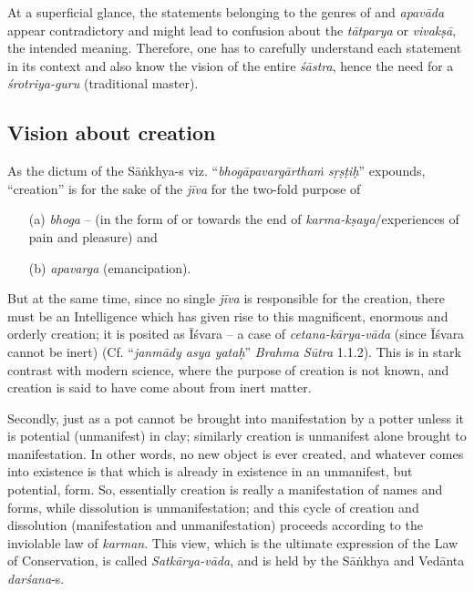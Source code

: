 At a superﬁcial glance, the statements belonging to the genres of and {\sl apavāda} appear contradictory and might lead to confusion about the {\sl tātparya} or {\sl vivakṣā}, the intended meaning. Therefore, one has to carefully understand each statement in its context and also know the vision of the entire {\sl śāstra}, hence the need for a {\sl śrotriya-guru} (traditional master).\\[-20pt]

\subsection{Vision about creation}\label{art12-sec2.3}

As the dictum of the Sāṅkhya-s viz. ``{\sl bhogāpavargārthaṁ sṛṣṭiḥ}'' expounds, ``creation'' is for the sake of the {\sl jīva} for the two-fold purpose of 
\begin{itemize}
\itemsep=0pt
\item[(a)] {\sl bhoga} -- (in the form of or towards the end of {\sl karma-kṣaya}/experiences of pain and pleasure) and 

\item[(b)] {\sl apavarga} (emancipation). 
\end{itemize}
But at the same time, since no single {\sl jīva} is responsible for the creation, there must be an Intelligence which has given rise to this magniﬁcent, enormous and orderly creation; it is posited as Īśvara -- a case of {\sl cetana-kārya-vāda} (since Īśvara cannot be inert) (Cf. ``{\sl janmādy asya yataḥ}'' {\sl Brahma Sūtra} 1.1.2). This is in stark contrast with modern science, where the purpose of creation is not known, and creation is said to have come about from inert matter. 

Secondly, just as a pot cannot be brought into manifestation by a potter unless it is potential (unmanifest) in clay; similarly creation is unmanifest alone brought to manifestation. In other words, no new object is ever created, and whatever comes into existence is that which is already in existence in an unmanifest, but potential, form. So, essentially creation is really a manifestation of names and forms, while dissolution is unmanifestation; and this cycle of creation and dissolution (manifestation and unmanifestation) proceeds according to the inviolable law of {\sl karman}. This view, which is the ultimate expression of the Law of Conservation, is called {\sl Satkārya-vāda}, and is held by the Sāṅkhya and Vedānta {\sl darśana}-s.\\[-20pt]

